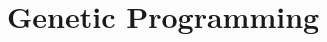 \documentclass[twocolumn, superscriptaddress]{revtex4}
\begin{document}

\section{Genetic Programming}






\end{document}
